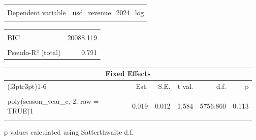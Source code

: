 \documentclass[
  12pt]{article}
\begin{document}
\begin{table}[!h]
\centering
\begin{tabular}{lr}
\toprule
\cellcolor{gray!10}{Observations} & \cellcolor{gray!10}{7023}\\
Dependent variable & usd\_revenue\_2024\_log\\
\cellcolor{gray!10}{Type} & \cellcolor{gray!10}{Mixed effects linear regression}\\
\bottomrule
\end{tabular}
\end{table} \begin{table}[!h]
\centering
\begin{tabular}{lr}
\toprule
\cellcolor{gray!10}{AIC} & \cellcolor{gray!10}{20046.978}\\
BIC & 20088.119\\
\cellcolor{gray!10}{Pseudo-R² (fixed effects)} & \cellcolor{gray!10}{0.006}\\
Pseudo-R² (total) & 0.791\\
\bottomrule
\end{tabular}
\end{table} \begin{table}[!h]
\centering
\begin{threeparttable}
\begin{tabular}{lrrrrr}
\toprule
\multicolumn{6}{c}{Fixed Effects} \\
\cmidrule(l{3pt}r{3pt}){1-6}
  & Est. & S.E. & t val. & d.f. & p\\
\midrule
\cellcolor{gray!10}{(Intercept)} & \cellcolor{gray!10}{15.916} & \cellcolor{gray!10}{0.074} & \cellcolor{gray!10}{214.884} & \cellcolor{gray!10}{36.552} & \cellcolor{gray!10}{0.000}\\
poly(season\_year\_c, 2, raw = TRUE)1 & 0.019 & 0.012 & 1.584 & 5756.860 & 0.113\\
\cellcolor{gray!10}{poly(season\_year\_c, 2, raw = TRUE)2} & \cellcolor{gray!10}{-0.004} & \cellcolor{gray!10}{0.001} & \cellcolor{gray!10}{-4.451} & \cellcolor{gray!10}{5650.505} & \cellcolor{gray!10}{0.000}\\
\bottomrule
\end{tabular}
\begin{tablenotes}
\item  p values calculated using Satterthwaite d.f. 
\end{tablenotes}
\end{threeparttable}
\end{table} \begin{table}[!h]

\end{table}
\end{document}
